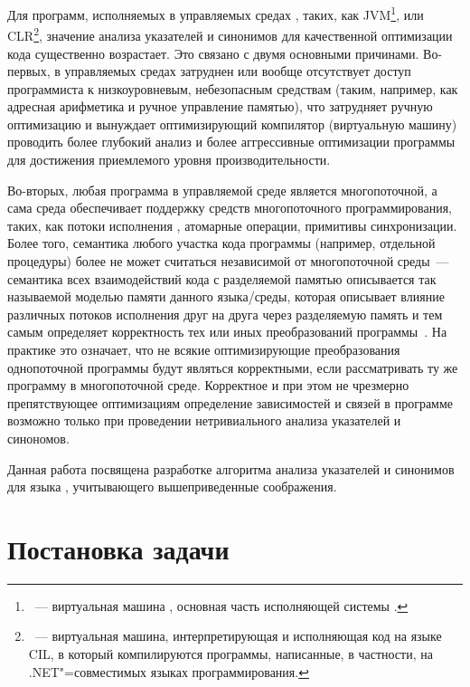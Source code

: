 \documentclass[14pt,titlepage,draft]{extarticle}
\newcommand{\java}{\eng{Java}\xspace}
\begin{document}
    Для программ, исполняемых в управляемых средах , таких, как JVM\footnote{~---
    виртуальная машина \java, основная часть исполняющей системы \java.}, или
    CLR\footnote{~--- виртуальная машина,
    интерпретирующая и исполняющая код на языке CIL, в который компилируются
    программы, написанные, в частности, на .NET"=совместимых языках
    программирования.}, значение анализа указателей и синонимов для
    качественной оптимизации кода существенно возрастает. Это связано с двумя
    основными причинами. Во-первых, в управляемых средах затруднен или вообще
    отсутствует доступ программиста к низкоуровневым, небезопасным средствам
    (таким, например, как адресная арифметика и ручное управление памятью), что
    затрудняет ручную оптимизацию и вынуждает оптимизирующий компилятор
    (виртуальную машину) проводить более глубокий анализ и более аггрессивные
    оптимизации программы для достижения приемлемого уровня производительности.

    Во-вторых, любая программа в управляемой среде является многопоточной, а
    сама среда обеспечивает поддержку средств многопоточного программирования,
    таких, как потоки исполнения , атомарные операции,
    примитивы синхронизации. Более того, семантика любого участка кода
    программы (например, отдельной процедуры) более не может считаться
    независимой от многопоточной среды~--- семантика всех взаимодействий кода с
    разделяемой памятью описывается так называемой моделью памяти данного
    языка/среды, которая описывает влияние различных потоков исполнения друг на
    друга через разделяемую память и тем самым определяет корректность тех или
    иных преобразований программы~\cite{manson_jmm}. На практике это означает,
    что не всякие оптимизирующие преобразования однопоточной программы будут
    являться корректными, если рассматривать ту же программу в многопоточной
    среде. Корректное и при этом не чрезмерно препятствующее оптимизациям
    определение зависимостей и связей в программе возможно только при
    проведении нетривиального анализа указателей и синономов.

    Данная работа посвящена разработке алгоритма анализа указателей и синонимов
    для языка \java, учитывающего вышеприведенные соображения.

  \section{Постановка задачи}
\end{document}
